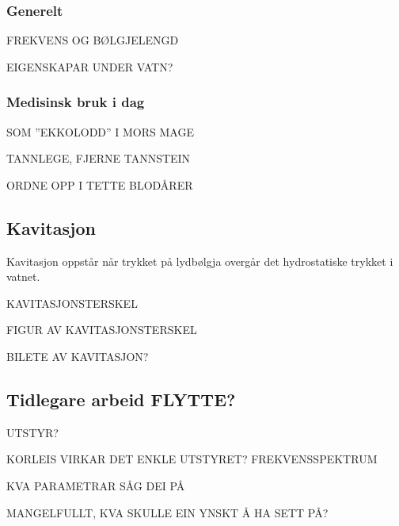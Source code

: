 \subsubsection*{Generelt}
FREKVENS OG BØLGJELENGD

EIGENSKAPAR UNDER VATN?

\subsubsection*{Medisinsk bruk i dag}
SOM ''EKKOLODD'' I MORS MAGE

TANNLEGE, FJERNE TANNSTEIN

ORDNE OPP I TETTE BLODÅRER

\subsection{Kavitasjon}
Kavitasjon oppstår når trykket på lydbølgja overgår det hydrostatiske trykket i vatnet.\cite{Kinsler:2000rc}

KAVITASJONSTERSKEL

FIGUR AV KAVITASJONSTERSKEL

BILETE AV KAVITASJON?

\subsection{Tidlegare arbeid FLYTTE?}
UTSTYR?

KORLEIS VIRKAR DET ENKLE UTSTYRET? FREKVENSSPEKTRUM

KVA PARAMETRAR SÅG DEI PÅ

MANGELFULLT, KVA SKULLE EIN YNSKT Å HA SETT PÅ?
